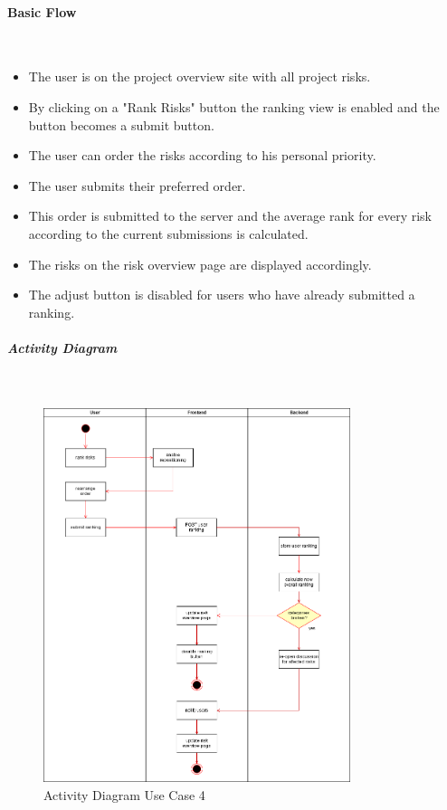 \paragraph*{Basic Flow} \mbox{}\\
\begin{itemize}
	\vspace{-3mm}
	\setlength\itemsep{-1em}
	\item The user is on the project overview site with all project risks.
	\item By clicking on a "Rank Risks" button the ranking view is enabled and the button becomes a submit button.
	\item The user can order the risks according to his personal priority.
	\item The user submits their preferred order.
	\item This order is submitted to the server and the average rank for every risk according to the current submissions is calculated.
	\item The risks on the risk overview page are displayed accordingly.
	\item The adjust button is disabled for users who have already submitted a ranking.
\end{itemize}

\subparagraph{Activity Diagram}\mbox{}\\
\begin{figure}[h]
	\centering
	\includegraphics[width=0.8\textwidth]{Content/Domain/UC4RiskAdjustmentDiagram.png}
	\caption{Activity Diagram Use Case 4}
	\label{fig:label44}
\end{figure}

